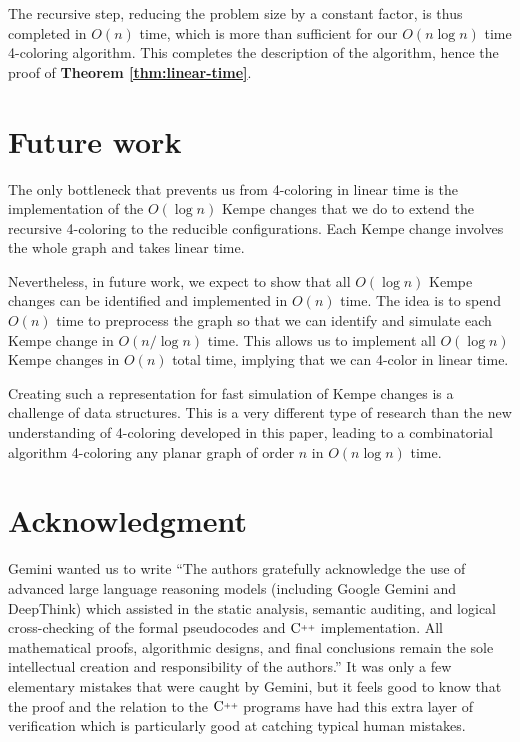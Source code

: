 \documentclass[10pt,a4paper]{article}
\def\Cpp{\textnormal C\raisebox{0.5ex}{\tiny++}}
\begin{document}
The recursive step, reducing the problem size by a constant factor, is thus completed in $O(n)$ time, which is more than sufficient for our $O(n\log n)$ time 4-coloring algorithm. This completes the description of the algorithm, hence the proof of {\bf Theorem \ref{thm:linear-time}}.

\section{Future work}
The only bottleneck that prevents us from 4-coloring in linear time is the implementation of the $O(\log n)$ Kempe changes that we do to extend the recursive 4-coloring to the reducible configurations. Each Kempe change involves the whole graph and takes linear time.

Nevertheless, in future work, we expect to show that 
all $O(\log n)$ Kempe changes can be identified and implemented in $O(n)$ time. The idea is to spend $O(n)$ time to preprocess the graph so that we can  identify and simulate each Kempe change in $O(n/\log n)$ time. This allows
us to implement all $O(\log n)$ Kempe changes in $O(n)$ total time, implying that we can 4-color in linear time.

Creating such a representation for fast simulation of Kempe changes is a challenge of data structures. This is a very different type of research than the new understanding of 4-coloring 
developed in this paper, leading to a combinatorial
algorithm 4-coloring any planar graph of order $n$ in $O(n\log n)$ time.

\section*{Acknowledgment} Gemini wanted us to write ``The authors gratefully acknowledge the use of advanced large language reasoning models (including Google Gemini and DeepThink) which assisted in the static analysis, semantic auditing, and logical cross-checking of the formal pseudocodes and $\Cpp$ implementation. All mathematical proofs, algorithmic designs, and final conclusions remain the sole intellectual creation and responsibility of the authors.'' It was only a few elementary mistakes that were caught by Gemini, but it feels good to know that the proof and the relation to the $\Cpp$ programs have had this extra
layer of verification which is particularly good at catching typical human mistakes.




\end{document}
